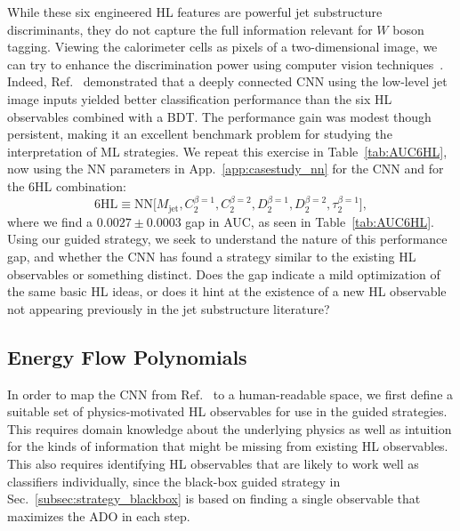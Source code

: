 \documentclass[aps,prd,twocolumn,superscriptaddress,preprintnumbers,nofootinbib,longbibliography,floatfix]{revtex4-1}
\newcommand{\NN}{\text{NN}}
\newcommand{\HL}{\text{HL}}
\newcommand{\rref}[1]{Ref.~\cite{#1}}
\newcommand{\Tab}[1]{Table~\ref{#1}}
\newcommand{\Sec}[1]{Sec.~\ref{#1}}
\newcommand{\App}[1]{App.~\ref{#1}}
\begin{document}
While these six engineered HL features are powerful jet substructure discriminants, they do not capture the full information relevant for $W$ boson tagging. Viewing the calorimeter cells as pixels of a two-dimensional image, we can try to enhance the discrimination power using computer vision techniques~\cite{Cogan:2014oua,deOliveira:2015xxd,Almeida:2015jua,Baldi:2016fql,Barnard:2016qma,Komiske:2016rsd,ATL-PHYS-PUB-2017-017,Kasieczka:2017nvn,Macaluso:2018tck}. Indeed, \rref{Baldi:2016fql} demonstrated that a deeply connected CNN using the low-level  jet image inputs yielded better classification performance than the six HL observables combined with a BDT. The performance gain was modest though persistent, making it an excellent benchmark problem for studying the interpretation of ML strategies. We repeat this exercise in \Tab{tab:AUC6HL}, now using the NN parameters in \App{app:casestudy_nn} for the CNN and for the 6HL combination:
\begin{equation}
	6\HL \equiv \NN\big[M_{\text{jet}}, C_2^{\beta=1}, C_2^{\beta=2},D_2^{\beta=1},D_2^{\beta=2},\tau_2^{\beta=1}\big],
\end{equation}
where we find a $0.0027 \pm 0.0003$ gap in AUC, as seen in \Tab{tab:AUC6HL}. Using our guided strategy, we seek to understand the nature of this performance gap, and whether the CNN has found a strategy similar to the existing HL observables or something distinct. Does the gap indicate a mild optimization of the same basic HL ideas, or does it hint at the existence of a new HL observable not appearing previously in the jet substructure literature?

\subsection{Energy Flow Polynomials}
\label{subsec:casestudy_efps}
In order to map the CNN from \rref{Baldi:2016fql} to a human-readable space, we first define a suitable set of physics-motivated HL observables for use in the guided strategies. This requires domain knowledge about the underlying physics as well as intuition for the kinds of information that might be missing from existing HL observables. This also requires identifying HL observables that are likely to work well as classifiers individually, since the black-box guided strategy in \Sec{subsec:strategy_blackbox} is based on finding a single observable that maximizes the ADO in each step.
\end{document}
